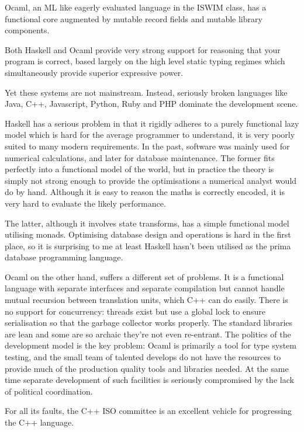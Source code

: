 \documentclass[oneside]{book}
\begin{document}
Ocaml, an ML like eagerly evaluated language in the
ISWIM class, has a functional core augmented by mutable
record fields and mutable library components.

Both Haskell and Ocaml provide very strong support for
reasoning that your program is correct, based largely
on the high level static typing regimes which simultaneously
provide superior expressive power.

Yet these systems are not mainstream. Instead, seriously
broken languages like Java, C++, Javascript, Python, Ruby and
PHP dominate the development scene.

Haskell has a serious problem in that it rigidly adheres to a
purely functional lazy model which is hard for the average
programmer to understand, it is very poorly suited to many
modern requirements. In the past, software was mainly used
for numerical calculations, and later for database maintenance.
The former fits perfectly into a functional model of the world,
but in practice the theory is simply not strong enough to provide
the optimisations a numerical analyst would do by hand.
Although it is easy to reason the maths is correctly encoded,
it is very hard to evaluate the likely performance.

The latter, although it involves state transforms, has a simple
functional model utilising monads. Optimising database design
and operations is hard in the first place, so it is surprising
to me at least Haskell hasn't been utilised as the prima
database programming language.

Ocaml on the other hand, suffers a different set of problems.
It is a functional language with separate interfaces and separate
compilation but cannot handle mutual recursion between 
translation units, which C++ can do easily. There is no support
for concurrency: threads exist but use a global lock to ensure
serialisation so that the garbage collector works properly.
The standard libraries are lean and some are so archaic they're
not even re-entrant. The politics of the development
model is the key problem: Ocaml is primarily a tool for
type system testing, and the small team of talented
develops do not have the resources to provide much of the
production quality tools and libraries needed. At the same
time separate development of such facilities 
is seriously compromised by the lack of political coordination.

For all its faults, the C++ ISO committee is an excellent vehicle
for progressing the C++ language.
\end{document}
